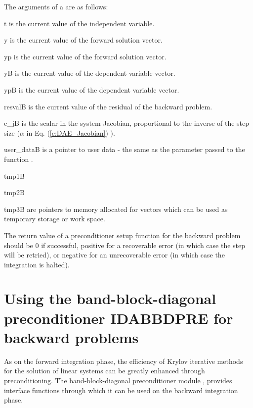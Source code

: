 {
  The arguments of a  are as follows:
  \begin{args}
  \item[t]
    is the current value of the independent variable.
  \item[y]
    is the current value of the forward solution vector.
  \item[yp]
    is the current value of the forward solution vector.
  \item[yB]
    is the current value of the dependent variable vector.
  \item[ypB]
    is the current value of the dependent variable vector.
  \item[resvalB]
    is the current value of the residual of the backward problem.
  \item[c\_jB]
    is the scalar in the system Jacobian, proportional to the inverse of the
    step size ($\alpha$ in Eq. (\ref{e:DAE_Jacobian}) ).
  \item[user\_dataB]
    is a pointer to user data - the same as the 
    parameter passed to the function .
  \item[tmp1B]
  \item[tmp2B]
  \item[tmp3B]
    are pointers to memory allocated for vectors which can be used           
    as temporary storage or work space.    
  \end{args}
}
{
  The return value of a preconditioner setup function for the backward
  problem should be $0$ if successful, 
  positive for a recoverable error (in which case the step will be retried),     
  or negative for an unrecoverable error (in which case the integration is halted).
}
{}

\section{Using the band-block-diagonal preconditioner IDABBDPRE for backward problems}

As on the forward integration phase, the efficiency of Krylov iterative methods 
for the solution of linear systems can be greatly enhanced through preconditioning.
The band-block-diagonal preconditioner module {\idabbdpre},
provides interface functions through which it can be used on the backward integration phase.

